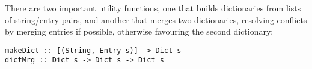 There are two important utility functions,
one that builds dictionaries from lists of string/entry pairs,
and another that merges two dictionaries, resolving conflicts
by merging entries if possible, otherwise favouring the
second dictionary:
\begin{verbatim}
makeDict :: [(String, Entry s)] -> Dict s
dictMrg :: Dict s -> Dict s -> Dict s
\end{verbatim}
